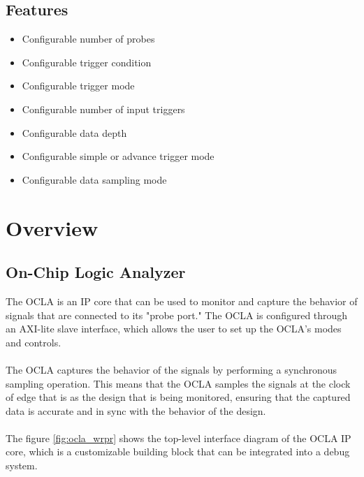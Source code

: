 \documentclass[phv, 11pt ]{SelfArx} %
\begin{document}
{	\subsection*{\fontsize{14}{16}\selectfont  Features}
	\begin{itemize}[noitemsep]
		\item Configurable number of probes
		\item Configurable trigger condition
		\item Configurable trigger mode
		\item Configurable number of input triggers
		\item Configurable data depth
		\item Configurable simple or advance trigger mode
		\item Configurable data sampling mode
	\end{itemize}



\newpage
\section*{\hfill \fontsize{24}{28} Overview} %

\subsection*{\fontsize{14}{16}\selectfont On-Chip Logic Analyzer}
The OCLA is an IP core that can be used to monitor and capture the behavior of signals that are connected to its "probe port." The OCLA is configured through an AXI-lite slave interface, which allows the user to set up the OCLA's modes and controls.
\\ \\The OCLA captures the behavior of the signals by performing a synchronous sampling operation. This means that the OCLA samples the signals at the clock of edge that is as the design that is being monitored, ensuring that the captured data is accurate and in sync with the behavior of the design.
\\ \\The figure \ref{fig:ocla_wrpr} shows the top-level interface diagram of the OCLA IP core, which is a customizable building block that can be integrated into a debug system.

}
\end{document}

